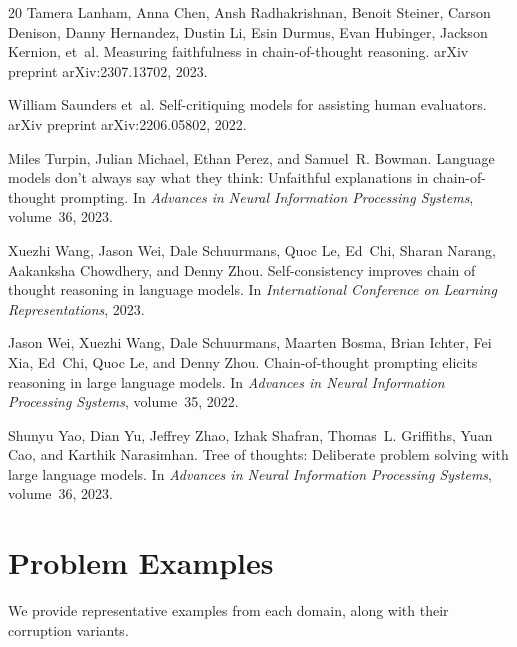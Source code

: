 \documentclass{article}
\begin{document}
\begin{thebibliography}{20}
Tamera Lanham, Anna Chen, Ansh Radhakrishnan, Benoit Steiner, Carson Denison, Danny Hernandez, Dustin Li, Esin Durmus, Evan Hubinger, Jackson Kernion, et~al.
\newblock Measuring faithfulness in chain-of-thought reasoning.
\newblock arXiv preprint arXiv:2307.13702, 2023.

William Saunders et~al.
\newblock Self-critiquing models for assisting human evaluators.
\newblock arXiv preprint arXiv:2206.05802, 2022.

Miles Turpin, Julian Michael, Ethan Perez, and Samuel~R. Bowman.
\newblock Language models don't always say what they think: Unfaithful explanations in chain-of-thought prompting.
\newblock In \emph{Advances in Neural Information Processing Systems}, volume~36, 2023.

Xuezhi Wang, Jason Wei, Dale Schuurmans, Quoc Le, Ed~Chi, Sharan Narang, Aakanksha Chowdhery, and Denny Zhou.
\newblock Self-consistency improves chain of thought reasoning in language models.
\newblock In \emph{International Conference on Learning Representations}, 2023.

Jason Wei, Xuezhi Wang, Dale Schuurmans, Maarten Bosma, Brian Ichter, Fei Xia, Ed~Chi, Quoc Le, and Denny Zhou.
\newblock Chain-of-thought prompting elicits reasoning in large language models.
\newblock In \emph{Advances in Neural Information Processing Systems}, volume~35, 2022.

Shunyu Yao, Dian Yu, Jeffrey Zhao, Izhak Shafran, Thomas~L. Griffiths, Yuan Cao, and Karthik Narasimhan.
\newblock Tree of thoughts: Deliberate problem solving with large language models.
\newblock In \emph{Advances in Neural Information Processing Systems}, volume~36, 2023.

\end{thebibliography}

\appendix
\section{Problem Examples}
\label{app:problems}

We provide representative examples from each domain, along with their corruption variants.
\end{document}
